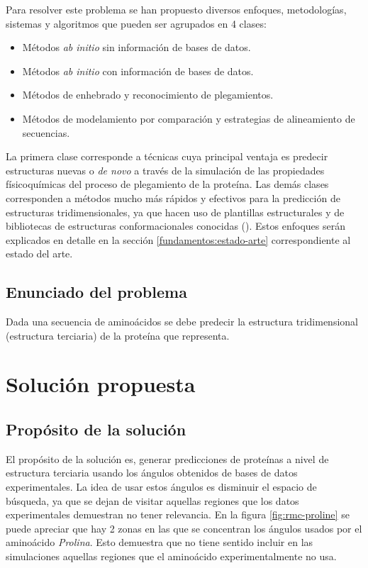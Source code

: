 Para resolver este problema se han propuesto diversos enfoques, metodologías, sistemas y algoritmos que pueden ser agrupados en 4 clases:
\begin{itemize}
    \item Métodos \textit{ab initio} sin información de bases de datos.
    \item Métodos \textit{ab initio} con información de bases de datos.
    \item Métodos de enhebrado y reconocimiento de plegamientos.
    \item Métodos de modelamiento por comparación y estrategias de alineamiento de secuencias.
\end{itemize}
La primera clase corresponde a técnicas cuya principal ventaja es predecir estructuras nuevas o \textit{de novo} a través de la simulación de las propiedades físicoquímicas del proceso de plegamiento de la proteína. Las demás clases corresponden a métodos mucho más rápidos y efectivos para la predicción de estructuras tridimensionales, ya que hacen uso de plantillas estructurales y de bibliotecas de estructuras conformacionales conocidas (\citealp{Dorn2014251}). Estos enfoques serán explicados en detalle en la sección \ref{fundamentos:estado-arte} correspondiente al estado del arte.


\subsection{Enunciado del problema}
\label{intro:enunciado}
Dada una secuencia de aminoácidos se debe predecir la estructura tridimensional (estructura terciaria) de la proteína que representa.

\section{Soluci\'on propuesta}
\label{intro:solucion}

\subsection{Prop\'osito de la solución}

El propósito de la solución es, generar predicciones de proteínas a nivel de estructura terciaria usando los ángulos obtenidos de bases de datos experimentales. La idea de usar estos ángulos es disminuir el espacio de búsqueda, ya que se dejan de visitar aquellas regiones que los datos experimentales demuestran no tener relevancia. En la figura \ref{fig:rmc-proline} se puede apreciar que hay 2 zonas en las que se concentran los ángulos usados por el aminoácido \textit{Prolina}. Esto demuestra que no tiene sentido incluir en las simulaciones aquellas regiones que el aminoácido experimentalmente no usa. 

